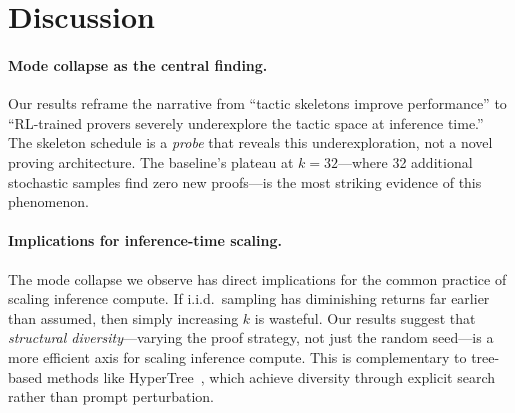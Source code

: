 \documentclass{article}
\begin{document}
\section{Discussion}
\label{sec:discussion}

\paragraph{Mode collapse as the central finding.}
Our results reframe the narrative from ``tactic skeletons improve performance'' to ``RL-trained provers severely underexplore the tactic space at inference time.'' The skeleton schedule is a \emph{probe} that reveals this underexploration, not a novel proving architecture. The baseline's plateau at $k{=}32$---where 32 additional stochastic samples find zero new proofs---is the most striking evidence of this phenomenon.

\paragraph{Implications for inference-time scaling.}
The mode collapse we observe has direct implications for the common practice of scaling inference compute. If i.i.d.\ sampling has diminishing returns far earlier than assumed, then simply increasing $k$ is wasteful. Our results suggest that \emph{structural diversity}---varying the proof strategy, not just the random seed---is a more efficient axis for scaling inference compute. This is complementary to tree-based methods like HyperTree~\cite{lample2022hypertree}, which achieve diversity through explicit search rather than prompt perturbation.
\end{document}
